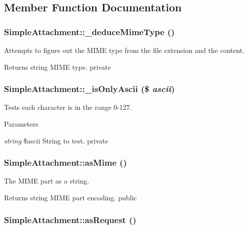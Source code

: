 \subsection{Member Function Documentation}
\hypertarget{class_simple_attachment_a2294435511c40e35261be5b340774060}{
\subsubsection[{\_\-deduceMimeType}]{\setlength{\rightskip}{0pt plus 5cm}SimpleAttachment::\_\-deduceMimeType ()}}
\label{class_simple_attachment_a2294435511c40e35261be5b340774060}
Attempts to figure out the MIME type from the file extension and the content. \begin{DoxyReturn}{Returns}
string MIME type.  private 
\end{DoxyReturn}
\hypertarget{class_simple_attachment_a59336f1cbc7ada48f8eb1015ec24ae65}{
\subsubsection[{\_\-isOnlyAscii}]{\setlength{\rightskip}{0pt plus 5cm}SimpleAttachment::\_\-isOnlyAscii (\$ {\em ascii})}}
\label{class_simple_attachment_a59336f1cbc7ada48f8eb1015ec24ae65}
Tests each character is in the range 0-\/127. 
\begin{DoxyParams}{Parameters}
\item[{\em string}]\$ascii String to test.  private \end{DoxyParams}
\hypertarget{class_simple_attachment_ad569cac30011632504cec6b9efdd16fb}{
\subsubsection[{asMime}]{\setlength{\rightskip}{0pt plus 5cm}SimpleAttachment::asMime ()}}
\label{class_simple_attachment_ad569cac30011632504cec6b9efdd16fb}
The MIME part as a string. \begin{DoxyReturn}{Returns}
string MIME part encoding.  public 
\end{DoxyReturn}
\hypertarget{class_simple_attachment_a42ee771da24f26645168f42447def83a}{
\subsubsection[{asRequest}]{\setlength{\rightskip}{0pt plus 5cm}SimpleAttachment::asRequest ()}}
